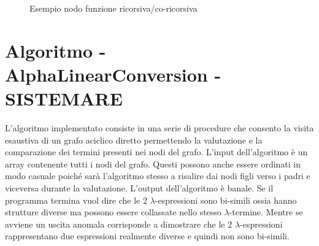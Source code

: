 \documentclass[12pt,a4paper,openright,twoside]{report}
\begin{document}
\begin{figure}[h]
\begin{center}
\caption[]{Esempio nodo funzione ricorsiva/co-ricorsiva}\label{fig:prima}
\end{center}
\end{figure}






\clearpage{\pagestyle{empty}\cleardoublepage}
\chapter{Algoritmo - AlphaLinearConversion - SISTEMARE}                %
\lhead[\fancyplain{}{\bfseries\thepage}]{\fancyplain{}{\bfseries\rightmark}}
L'algoritmo implementato consiste in una serie di procedure che consento la visita esaustiva di un grafo aciclico diretto permettendo la valutazione e la comparazione dei termini presenti nei nodi del grafo.\newline
L'input dell'algoritmo \`e un array contenente tutti i nodi del grafo. Questi possono anche essere ordinati in modo casuale poich\'e sar\`a l'algoritmo stesso a risalire dai nodi figli verso i padri e viceversa durante la valutazione. 
L'output dell'algoritmo \`e banale. Se il programma termina vuol dire che le 2 $\lambda$-espressioni sono bi-simili ossia hanno strutture diverse ma possono essere collassate nello stesso $\lambda$-termine. Mentre se avviene un uscita anomala corrisponde a dimostrare che le 2 $\lambda$-espressioni rappresentano due espressioni realmente diverse e quindi non sono bi-simili.\newline
\end{document}
